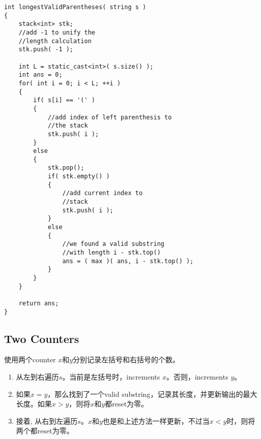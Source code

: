 \begin{lstlisting}[style=customc, caption={Stack}]
int longestValidParentheses( string s )
{
    stack<int> stk;
    //add -1 to unify the
    //length calculation
    stk.push( -1 );

    int L = static_cast<int>( s.size() );
    int ans = 0;
    for( int i = 0; i < L; ++i )
    {
        if( s[i] == '(' )
        {
            //add index of left parenthesis to
            //the stack
            stk.push( i );
        }
        else
        {
            stk.pop();
            if( stk.empty() )
            {
                //add current index to
                //stack
                stk.push( i );
            }
            else
            {
                //we found a valid substring
                //with length i - stk.top()
                ans = ( max )( ans, i - stk.top() );
            }
        }
    }

    return ans;
}
\end{lstlisting}


\subsection{Two Counters}
使用两个counter $x$和$y$分别记录左括号和右括号的个数。
\begin{enumerate}
\item 从左到右遍历$s$。当前是左括号时，increments $x$。否则，increments $y$。
\item 如果$x=y$，那么找到了一个valid substring，记录其长度，并更新输出的最大长度。如果$x>y$，则将$x$和$y$都reset为零。
\item 接着, 从右到左遍历$s$。$x$和$y$也是和上述方法一样更新，不过当$x<y$时，则将两个都reset为零。
\end{enumerate}

